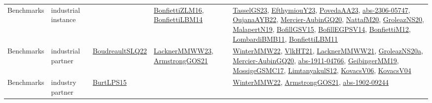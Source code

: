 {\begin{longtable}{lp{3cm}>{\raggedright}p{6cm}>{\raggedright}p{6cm}p{8cm}}
Benchmarks & industrial instance &  & \href{papers/BonfiettiZLM16.pdf}{BonfiettiZLM16}\cite{BonfiettiZLM16}, \href{articles/BonfiettiLBM14.pdf}{BonfiettiLBM14}\cite{BonfiettiLBM14} & \href{papers/TasselGS23.pdf}{TasselGS23}\cite{TasselGS23}, \href{papers/EfthymiouY23.pdf}{EfthymiouY23}\cite{EfthymiouY23}, \href{papers/PovedaAA23.pdf}{PovedaAA23}\cite{PovedaAA23}, \href{articles/abs-2306-05747.pdf}{abs-2306-05747}\cite{abs-2306-05747}, \href{papers/OujanaAYB22.pdf}{OujanaAYB22}\cite{OujanaAYB22}, \href{papers/Mercier-AubinGQ20.pdf}{Mercier-AubinGQ20}\cite{Mercier-AubinGQ20}, \href{papers/NattafM20.pdf}{NattafM20}\cite{NattafM20}, \href{papers/GroleazNS20.pdf}{GroleazNS20}\cite{GroleazNS20}, \href{papers/MalapertN19.pdf}{MalapertN19}\cite{MalapertN19}, \href{papers/BofillGSV15.pdf}{BofillGSV15}\cite{BofillGSV15}, \href{papers/BofillEGPSV14.pdf}{BofillEGPSV14}\cite{BofillEGPSV14}, \href{papers/BonfiettiM12.pdf}{BonfiettiM12}\cite{BonfiettiM12}, \href{papers/LombardiBMB11.pdf}{LombardiBMB11}\cite{LombardiBMB11}, \href{papers/BonfiettiLBM11.pdf}{BonfiettiLBM11}\cite{BonfiettiLBM11}\\
Benchmarks & industrial partner & \href{papers/BoudreaultSLQ22.pdf}{BoudreaultSLQ22}\cite{BoudreaultSLQ22} & \href{articles/LacknerMMWW23.pdf}{LacknerMMWW23}\cite{LacknerMMWW23}, \href{papers/ArmstrongGOS21.pdf}{ArmstrongGOS21}\cite{ArmstrongGOS21} & \href{papers/WinterMMW22.pdf}{WinterMMW22}\cite{WinterMMW22}, \href{articles/VlkHT21.pdf}{VlkHT21}\cite{VlkHT21}, \href{papers/LacknerMMWW21.pdf}{LacknerMMWW21}\cite{LacknerMMWW21}, \href{papers/GroleazNS20a.pdf}{GroleazNS20a}\cite{GroleazNS20a}, \href{papers/Mercier-AubinGQ20.pdf}{Mercier-AubinGQ20}\cite{Mercier-AubinGQ20}, \href{articles/abs-1911-04766.pdf}{abs-1911-04766}\cite{abs-1911-04766}, \href{papers/GeibingerMM19.pdf}{GeibingerMM19}\cite{GeibingerMM19}, \href{papers/MossigeGSMC17.pdf}{MossigeGSMC17}\cite{MossigeGSMC17}, \href{articles/LimtanyakulS12.pdf}{LimtanyakulS12}\cite{LimtanyakulS12}, \href{papers/KovacsV06.pdf}{KovacsV06}\cite{KovacsV06}, \href{papers/KovacsV04.pdf}{KovacsV04}\cite{KovacsV04}\\
Benchmarks & industry partner & \href{papers/BurtLPS15.pdf}{BurtLPS15}\cite{BurtLPS15} &  & \href{papers/WinterMMW22.pdf}{WinterMMW22}\cite{WinterMMW22}, \href{papers/ArmstrongGOS21.pdf}{ArmstrongGOS21}\cite{ArmstrongGOS21}, \href{articles/abs-1902-09244.pdf}{abs-1902-09244}\cite{abs-1902-09244}\\

\end{longtable}}

